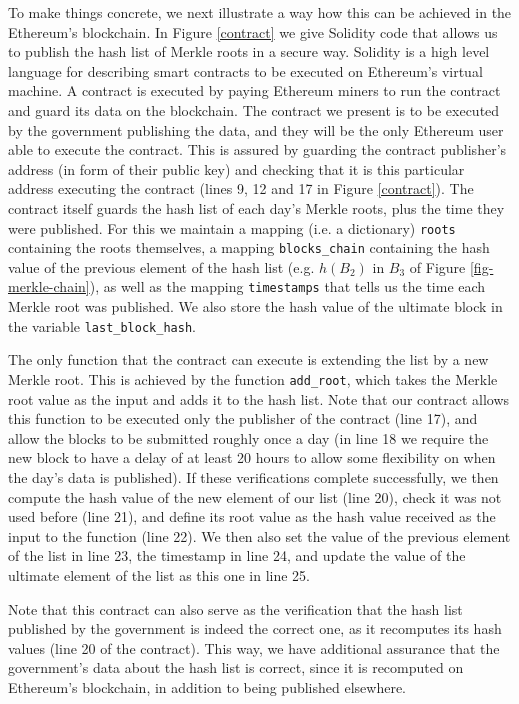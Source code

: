 To make things concrete, we next illustrate a way how this can be achieved in the Ethereum's blockchain. In Figure \ref{contract} we give Solidity code that allows us to publish the hash list of Merkle roots in a secure way. Solidity \cite{Solidity} is a high level language for describing smart contracts to be executed on Ethereum's virtual machine. A contract is executed by paying Ethereum miners to run the contract and guard its data on the blockchain. The contract we present is to be executed by the government publishing the data, and they will be the only Ethereum user able to execute the contract. This is assured by guarding the contract publisher's address (in form of their public key) and checking that it is this particular address executing the contract (lines 9, 12 and 17 in Figure \ref{contract}). The contract itself guards the hash list of each day's Merkle roots, plus the time they were published. For this we maintain a mapping (i.e. a dictionary) \texttt{roots} containing the roots themselves, a mapping \texttt{blocks\_chain} containing the hash value of the previous element of the hash list (e.g. $h(B_2)$ in $B_3$ of Figure \ref{fig-merkle-chain}), as well as the mapping \texttt{timestamps} that tells us the time each Merkle root was published. We also store the hash value of the ultimate block in the variable \texttt{last\_block\_hash}.

The only function that the contract can execute is extending the list by a new Merkle root. This is achieved by the function \texttt{add\_root}, which takes the Merkle root value as the input and adds it to the hash list. Note that our contract allows this function to be executed only the publisher of the contract (line 17), and allow the blocks to be submitted roughly once a day (in line 18 we require the new block to have a delay of at least 20 hours to allow some flexibility on when the day's data is published). If these verifications complete successfully, we then compute the hash value of the new element of our list (line 20), check it was not used before (line 21), and define its root value as the hash value received as the input to the function (line 22). We then also set the value of the previous element of the list in line 23, the timestamp in line 24, and update the value of the ultimate element of the list as this one in line 25.

Note that this contract can also serve as the verification that the hash list published by the government is indeed the correct one, as it recomputes its hash values (line 20 of the contract). This way, we have additional assurance that the government's data about the hash list is correct, since it is recomputed on Ethereum's blockchain, in addition to being published elsewhere.

